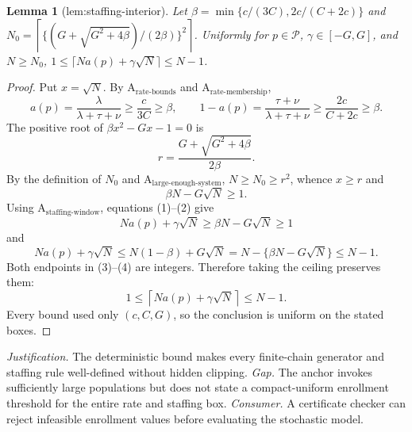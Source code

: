 \documentclass{article}
\newtheorem{lemma}{Lemma}
\begin{document}
\begin{lemma}[lem:staffing-interior]\label{lem:staffing-interior}
Let \(\beta=\min\{c/(3C),2c/(C+2c)\}\) and \(N_0=\left\lceil\{(G+\sqrt{G^2+4\beta})/(2\beta)\}^2\right\rceil\). Uniformly for \(p\in\mathcal P\), \(\gamma\in[-G,G]\), and \(N\ge N_0\), \(1\le\lceil Na(p)+\gamma\sqrt N\rceil\le N-1\).
\end{lemma}
\begin{proof}
Put \(x=\sqrt N\).  By \(\mathrm A_{\mathrm{rate\mbox{-}bounds}}\) and \(\mathrm A_{\mathrm{rate\mbox{-}membership}}\),
\[
 a(p)=\frac{\lambda}{\lambda+\tau+\nu}
 \geq \frac{c}{3C}\geq\beta,
 \qquad
 1-a(p)=\frac{\tau+\nu}{\lambda+\tau+\nu}
 \geq\frac{2c}{C+2c}\geq\beta.                       \tag{1}
\]
The positive root of \(\beta x^2-Gx-1=0\) is
\[
 r=\frac{G+\sqrt{G^2+4\beta}}{2\beta}.
\]
By the definition of \(N_0\) and \(\mathrm A_{\mathrm{large\mbox{-}enough\mbox{-}system}}\), \(N\geq N_0\geq r^2\), whence \(x\geq r\) and
\[
 \beta N-G\sqrt N\geq1.                                      \tag{2}
\]
Using \(\mathrm A_{\mathrm{staffing\mbox{-}window}}\), equations (1)--(2) give
\[
 Na(p)+\gamma\sqrt N\geq \beta N-G\sqrt N\geq1              \tag{3}
\]
and
\[
 Na(p)+\gamma\sqrt N
 \leq N(1-\beta)+G\sqrt N
 =N-\{\beta N-G\sqrt N\}\leq N-1.                            \tag{4}
\]
Both endpoints in (3)--(4) are integers.  Therefore taking the ceiling preserves them:
\[
 1\leq \left\lceil Na(p)+\gamma\sqrt N\right\rceil\leq N-1.
\]
Every bound used only \((c,C,G)\), so the conclusion is uniform on the stated boxes.
\end{proof}
\par\smallskip\noindent \textit{Justification.} The deterministic bound makes every finite-chain generator and staffing rule well-defined without hidden clipping. \textit{Gap.} The anchor invokes sufficiently large populations but does not state a compact-uniform enrollment threshold for the entire rate and staffing box. \textit{Consumer.} A certificate checker can reject infeasible enrollment values before evaluating the stochastic model.
\end{document}
